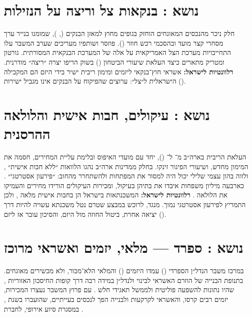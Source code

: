\section{נושא : בנקאות צל וריצה על הנזילות}
\label{sec:ch2-shadow}

חלק ניכר מהנכסים המאוגחים הוחזק בגופים מחוץ למאזן הבנקים (, ), שמומנו בנייר ערך מסחרי קצר מועד ובהסכמי רכש חוזר (). פוזסר ושותפיו \cite{pozsar2010} מעריכים שערב המשבר עלו התחייבויות מערכת הצל האמריקאית על אלה של המערכת הבנקאית המסורתית. גורטון ומטריק \cite{gorton2012} מתארים כיצד העלאת שיעורי הביטחון () בשוק הריפו יצרה ״ריצה״ מודרנית. \textbf{רלוונטיות לישראל:} אשראי חוץ־בנקאי ליזמים ומימון ריבית ישיר בידי היזם הם המקבילה הישראלית ל״צל״: ערוצים שהפיקוח על הבנקים אינו מגביל ישירות ().

\section{נושא : עיקולים, חבות אישית והלולאה ההרסנית}
\label{sec:ch2-foreclosures}

העלאת הריבית בארה״ב מ־ ל־ (), יחד עם מועדי האיפוס ובלימת עליית המחירים, חסמה את המימון מחדש, ושיעורי הפיגור זינקו. בחלק ממדינות ארה״ב נהגו הלוואות ״ללא חבות אישית״ , ולווה בהון עצמי שלילי  יכול היה למסור את המפתחות ולהשתחרר מהחוב: ״פירעון אסטרטגי״ . כארבעה מיליון משפחות איבדו את בתיהן בעיקול, ומכירות העיקולים הורידו מחירים והעמיקו את הלולאה \cite{fcic2011}. \textbf{רלוונטיות לישראל:} המשכנתאות בישראל הן בחבות אישית מלאה , ולכן התמריץ לפירעון אסטרטגי נמוך. מנגד, לרוכש במבצע  שטרם נטל משכנתא עשויה להיות דרך יציאה אחרת, ביטול החוזה מול היזם, והסיכון עובר אז ליזם ().

\section{נושא : ספרד — מלאי, יזמים ואשראי מרוכז}
\label{sec:ch2-spain}

במרכז משבר הנדל״ן הספרדי () עמדו היזמים () והמלאי הלא־מכור, ולא מכשירים מאוגחים. בתנופת הבנייה של  הוזרם האשראי לבינוי ולנדל״ן במידה רבה דרך קופות החיסכון האזוריות , שהיו נתונות להשפעה פוליטית ולממשל תאגידי חלש \cite{akin2014,bde2017}. עם פרוץ המשבר נעצרו המכירות, יזמים רבים קרסו, והאשראי לקרקעות ולבנייה הפך לנכסים בעייתיים, שהועברו בשנת , במסגרת סיוע אירופי, לחברת  \cite{bde2017}.

